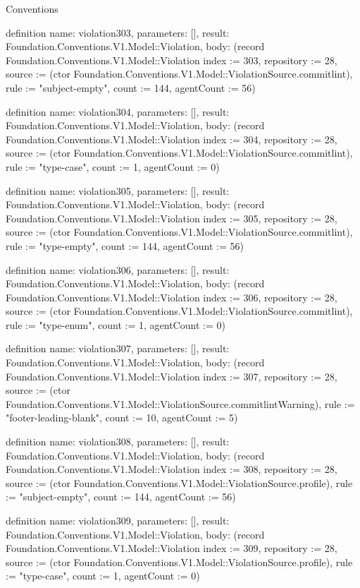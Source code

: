 \begin{lexlean}{Conventions}
\begin{semanticmodule}
definition{
  name: violation303,
  parameters: [],
  result: Foundation.Conventions.V1.Model::Violation,
  body: (record Foundation.Conventions.V1.Model::Violation {index := 303, repository := 28, source := (ctor Foundation.Conventions.V1.Model::ViolationSource.commitlint), rule := "subject-empty", count := 144, agentCount := 56})
}

definition{
  name: violation304,
  parameters: [],
  result: Foundation.Conventions.V1.Model::Violation,
  body: (record Foundation.Conventions.V1.Model::Violation {index := 304, repository := 28, source := (ctor Foundation.Conventions.V1.Model::ViolationSource.commitlint), rule := "type-case", count := 1, agentCount := 0})
}

definition{
  name: violation305,
  parameters: [],
  result: Foundation.Conventions.V1.Model::Violation,
  body: (record Foundation.Conventions.V1.Model::Violation {index := 305, repository := 28, source := (ctor Foundation.Conventions.V1.Model::ViolationSource.commitlint), rule := "type-empty", count := 144, agentCount := 56})
}

definition{
  name: violation306,
  parameters: [],
  result: Foundation.Conventions.V1.Model::Violation,
  body: (record Foundation.Conventions.V1.Model::Violation {index := 306, repository := 28, source := (ctor Foundation.Conventions.V1.Model::ViolationSource.commitlint), rule := "type-enum", count := 1, agentCount := 0})
}

definition{
  name: violation307,
  parameters: [],
  result: Foundation.Conventions.V1.Model::Violation,
  body: (record Foundation.Conventions.V1.Model::Violation {index := 307, repository := 28, source := (ctor Foundation.Conventions.V1.Model::ViolationSource.commitlintWarning), rule := "footer-leading-blank", count := 10, agentCount := 5})
}

definition{
  name: violation308,
  parameters: [],
  result: Foundation.Conventions.V1.Model::Violation,
  body: (record Foundation.Conventions.V1.Model::Violation {index := 308, repository := 28, source := (ctor Foundation.Conventions.V1.Model::ViolationSource.profile), rule := "subject-empty", count := 144, agentCount := 56})
}

definition{
  name: violation309,
  parameters: [],
  result: Foundation.Conventions.V1.Model::Violation,
  body: (record Foundation.Conventions.V1.Model::Violation {index := 309, repository := 28, source := (ctor Foundation.Conventions.V1.Model::ViolationSource.profile), rule := "type-case", count := 1, agentCount := 0})
}


\end{semanticmodule}
\end{lexlean}
